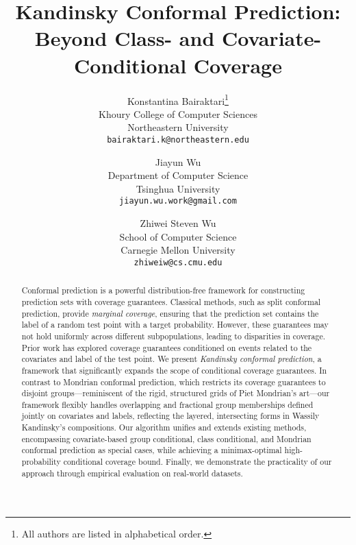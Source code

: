 \documentclass{article}
\title{Kandinsky Conformal Prediction: \\
Beyond Class- and Covariate-Conditional Coverage}
\author{Konstantina Bairaktari\thanks{All authors are listed in alphabetical order.}\\
        Khoury College of Computer Sciences\\
        Northeastern University \\
        \texttt{bairaktari.k@northeastern.edu}
        \and
        Jiayun Wu\footnotemark[1] \\
        Department of Computer Science\\
        Tsinghua University \\
        \texttt{jiayun.wu.work@gmail.com} \\
        \and
        Zhiwei Steven Wu\footnotemark[1] \\
        School of Computer Science\\
        Carnegie Mellon University\\
        \texttt{zhiweiw@cs.cmu.edu}
}
\date{}
\begin{document}
\maketitle

\begin{abstract}
Conformal prediction is a powerful distribution-free framework for constructing prediction sets with coverage guarantees. Classical methods, such as split conformal prediction, provide \emph{marginal coverage}, ensuring that the prediction set contains the label of a random test point with a target probability. However, these guarantees may not hold uniformly across different subpopulations, leading to disparities in coverage. Prior work has explored coverage guarantees conditioned on events related to the covariates and label of the test point. 
We present \emph{Kandinsky conformal prediction}, a framework that significantly expands the scope of conditional coverage guarantees. In contrast to Mondrian conformal prediction, which restricts its coverage guarantees to disjoint groups—reminiscent of the rigid, structured grids of Piet Mondrian’s art—our framework flexibly handles overlapping and fractional group memberships defined jointly on covariates and labels, reflecting the layered, intersecting forms in Wassily Kandinsky’s compositions. Our algorithm unifies and extends existing methods, encompassing covariate-based group conditional, class conditional, and Mondrian conformal prediction as special cases, while achieving a minimax-optimal high-probability conditional coverage bound.  Finally, we demonstrate the practicality of our approach through empirical evaluation on real-world datasets.


\end{abstract}
\end{document}
